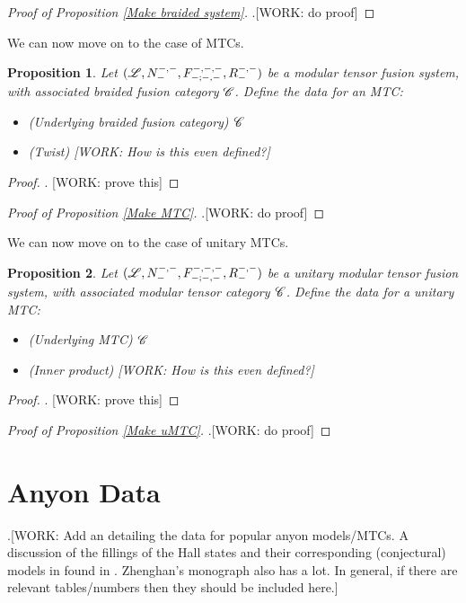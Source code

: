 \documentclass{article}
\newtheorem{proposition}{Proposition}[section]
\theoremstyle{definition}
\numberwithin{figure}{section}
\begin{document}
\begin{proof}[Proof of Proposition \ref{Make braided system}] .[WORK: do proof]
\end{proof}

We can now move on to the case of MTCs.

\begin{proposition} Let $(\mathscr{L},N^{\--,\--}_{\--},F^{\--,\--,\--}_{\--;\--,\--},R^{\--,\--}_{\--})$ be a modular tensor fusion system, with associated braided fusion category $\mathscr{C}$. Define the data for an MTC:

\begin{itemize}
\item (Underlying braided fusion category) $\mathscr{C}$
\item (Twist) [WORK: How is this even defined?]
\end{itemize}
\end{proposition}
\begin{proof}. [WORK: prove this]
\end{proof}

\begin{proof}[Proof of Proposition \ref{Make MTC}] .[WORK: do proof]
\end{proof}

We can now move on to the case of unitary MTCs.

\begin{proposition} Let $(\mathscr{L},N^{\--,\--}_{\--},F^{\--,\--,\--}_{\--;\--,\--},R^{\--,\--}_{\--})$ be a unitary modular tensor fusion system, with associated modular tensor category $\mathscr{C}$. Define the data for a unitary MTC:

\begin{itemize}
\item (Underlying MTC) $\mathscr{C}$
\item (Inner product) [WORK: How is this even defined?]
\end{itemize}
\end{proposition}
\begin{proof}. [WORK: prove this]
\end{proof}


\begin{proof}[Proof of Proposition \ref{Make uMTC}] .[WORK: do proof]
\end{proof}

\section{Anyon Data}

.[WORK: Add an detailing the data for popular anyon models/MTCs. A discussion of the fillings of the Hall states and their corresponding (conjectural) models in found in \cite{bruillard2017fermionic}. Zhenghan's monograph also has a lot. In general, if there are relevant tables/numbers then they should be included here.]



\end{document}

